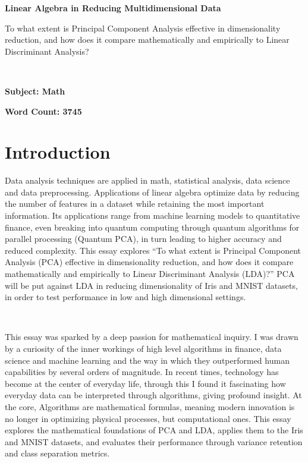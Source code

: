 \documentclass{article}
\begin{document}
\begin{titlepage}
   \begin{center}
       \vspace*{4cm}

       \textbf{Linear Algebra in Reducing Multidimensional Data}

       \vspace{0.5cm}
        To what extent is Principal Component Analysis effective in dimensionality reduction, and how does it compare mathematically and empirically to Linear Discriminant Analysis?

        \
        
       \textbf{ Subject: Math}
            
       \vspace{1.5cm}

       \textbf{Word Count: 3745}
       
\end{center}
\end{titlepage}

\newpage

\section{Introduction}

Data analysis techniques are applied in math, statistical analysis, data science and data preprocessing. Applications of linear algebra optimize data by reducing the number of features in a dataset while retaining the most important information. Its applications range from machine learning models to quantitative finance, even breaking into quantum computing through quantum algorithms for parallel processing (Quantum PCA), in turn leading to higher accuracy and reduced complexity. This essay explores ``To what extent is Principal Component Analysis (PCA) effective in dimensionality reduction, and how does it compare mathematically and empirically to Linear Discriminant Analysis (LDA)?'' PCA will be put against LDA in reducing dimensionality of Iris and MNIST datasets, in order to test performance in low and high dimensional settings. 

\

This essay was sparked by a deep passion for mathematical inquiry. I was drawn by a curiosity of the inner workings of high level algorithms in finance, data science and machine learning and the way in which they outperformed human capabilities by several orders of magnitude. In recent times, technology has become at the center of everyday life, through this I found it fascinating how everyday data can be interpreted through algorithms, giving profound insight. At the core, Algorithms are mathematical formulas, meaning modern innovation is no longer in optimizing physical processes, but computational ones. This essay explores the mathematical foundations of PCA and LDA, applies them to the Iris and MNIST datasets, and evaluates their performance through variance retention and class separation metrics.
\end{document}
